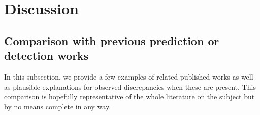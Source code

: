 \documentclass{aa}
\begin{document}
\begin{table*}
\setlength{\tabcolsep}{3pt}
\caption{Predicted and original properties for the $5$ sources in Stripe 82 with the highest predicted redshift on the unlabelled sources predicted to be Radio AGN. A description of the columns is presented in Appendix~\ref{sec:app_prediction_results}.}\label{table:pred_radio_AGN_unknown_S82}
\centering
{}
\end{table*}

\section{Discussion}\label{sec:discussion}

\subsection{Comparison with previous prediction or detection works}\label{sec:compare_previous_works}
In this subsection, we provide a few examples of related published works as well as plausible explanations for observed discrepancies when these are present. This comparison is hopefully representative of the whole literature on the subject but by no means complete in any way.
\end{document}

